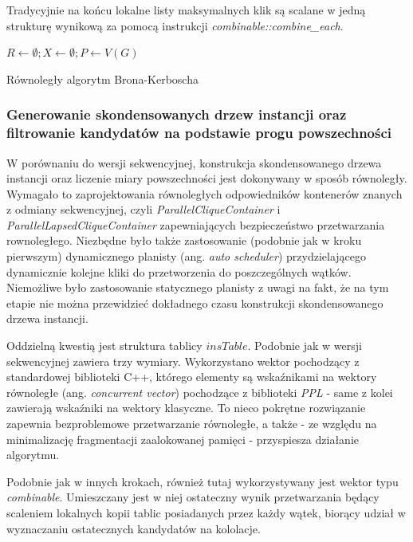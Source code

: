 \documentclass[12pt]{article}
\newcounter{algorytm}
\begin{document}
Tradycyjnie na końcu lokalne listy maksymalnych klik są scalane w jedną strukturę wynikową za pomocą instrukcji \textit{combinable::combine\_each}.
\begin{algorithm}

$R \leftarrow \emptyset; X \leftarrow \emptyset; P \leftarrow V(G)$\;
\caption{Równoległy algorytm Brona-Kerboscha}
\label{alg:bk3}
\end{algorithm}

 
\subsubsection{Generowanie skondensowanych drzew instancji oraz filtrowanie kandydatów na podstawie progu powszechności}

W porównaniu do wersji sekwencyjnej, konstrukcja skondensowanego drzewa instancji oraz liczenie miary powszechności jest dokonywany w sposób równoległy. Wymagało to zaprojektowania równoległych odpowiedników kontenerów znanych z odmiany sekwencyjnej, czyli \textit{ParallelCliqueContainer} i \textit{ParallelLapsedCliqueContainer} zapewniających bezpieczeństwo przetwarzania rownoległego. Niezbędne było także zastosowanie (podobnie jak w kroku pierwszym) dynamicznego planisty (ang. \textit{auto scheduler}) przydzielającego dynamicznie kolejne kliki do przetworzenia do poszczególnych wątków. Niemożliwe było zastosowanie statycznego planisty z uwagi na fakt, że na tym etapie nie można przewidzieć dokładnego czasu konstrukcji skondensowanego drzewa instancji.

Oddzielną kwestią jest struktura tablicy $ insTable $. Podobnie jak w wersji sekwencyjnej zawiera trzy wymiary. Wykorzystano wektor pochodzący z standardowej biblioteki C++, którego elementy są wskaźnikami na wektory równoległe (ang. \textit{concurrent vector}) pochodzące z biblioteki \textit{PPL} - same z kolei zawierają wskaźniki na wektory klasyczne. To nieco pokrętne rozwiązanie zapewnia bezproblemowe przetwarzanie równoległe, a także - ze względu na minimalizację fragmentacji zaalokowanej pamięci - przyspiesza działanie algorytmu.

Podobnie jak w innych krokach, również tutaj wykorzystywany jest wektor typu \textit{combinable}. Umieszczany jest w niej ostateczny wynik przetwarzania będący scaleniem lokalnych kopii tablic posiadanych przez każdy wątek, biorący udział w wyznaczaniu ostatecznych kandydatów na kololacje.
\end{document}
